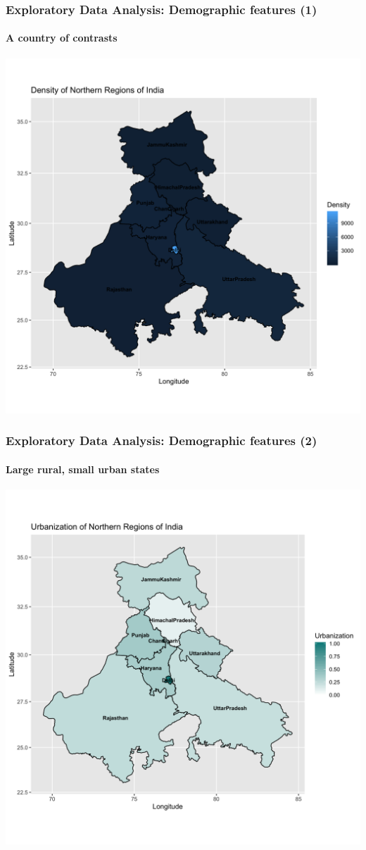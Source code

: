 \documentclass{beamer}
\begin{document}
{\begin{frame}
\end{frame}
\begin{frame}
	\frametitle{Exploratory Data Analysis: Demographic features (1)}
	\framesubtitle{A country of contrasts}
	\center \includegraphics[scale = 0.095]{den.png}
\end{frame}
\begin{frame}
	\frametitle{Exploratory Data Analysis: Demographic features (2)}
	\framesubtitle{Large rural, small urban states}
	\center \includegraphics[scale = 0.1]{urb.png}

\end{frame}}
\end{document}
